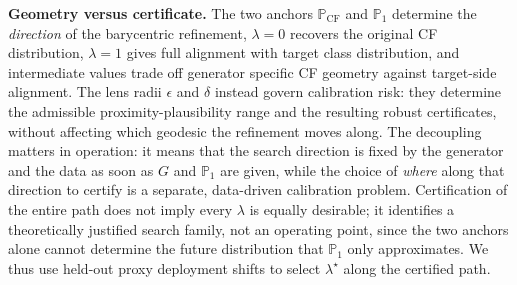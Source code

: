\textbf{Geometry versus certificate.}
The two anchors $\mathbb{P}_{\mathrm{CF}}$ and $\mathbb{P}_1$ determine the \emph{direction} of the barycentric refinement, $\lambda=0$ recovers the original CF distribution, $\lambda=1$ gives full alignment with target class distribution, and intermediate values trade off generator specific CF geometry against target-side alignment.
The lens radii $\epsilon$ and $\delta$ instead govern calibration risk: they determine the admissible proximity-plausibility range and the resulting robust certificates, without affecting which geodesic the refinement moves along. 
The decoupling matters in operation: it means that the search direction is fixed by the generator and the data as soon as $G$ and $\mathbb{P}_1$ are given, while the choice of \emph{where} along that direction to certify is a separate, data-driven calibration problem.
Certification of the entire path does not imply every $\lambda$ is equally desirable; it identifies a theoretically justified search family, not an operating point, since the two anchors alone cannot determine the future distribution that $\mathbb{P}_1$ only approximates.
We thus use held-out proxy deployment shifts to select $\lambda^\star$ along the certified path.


